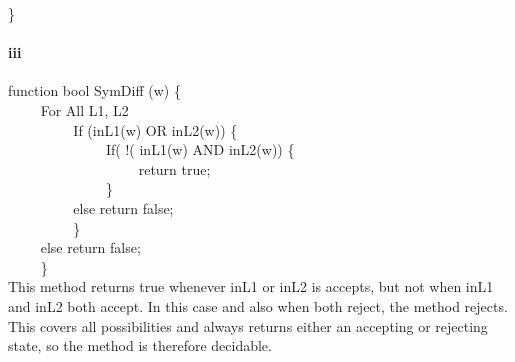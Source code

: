 \documentclass[10pt,letter]{article}
\begin{document}
\}

\paragraph{iii}
function bool SymDiff (w) \{  \\
$\qquad$ 	For All L1, L2 \\
$\qquad$ $\qquad$ If (inL1(w) OR inL2(w)) \{ \\
$\qquad$ $\qquad$ $\qquad$ If( !( inL1(w) AND inL2(w))  \{ \\
$\qquad$ $\qquad$ $\qquad$ $\qquad$ return true; \\
$\qquad$ $\qquad$ $\qquad$			\} \\
$\qquad$ $\qquad$ 		else return false; \\
$\qquad$	$\qquad$	\} \\
$\qquad$	else	return false; \\
$\qquad$ \} \\
This method returns true whenever inL1 or inL2 is accepts, but not when inL1 and inL2 both accept. In this case and also when both reject, the method rejects. This covers all possibilities and always returns either an accepting or rejecting state, so the method is therefore decidable. 
			
\end{document}

